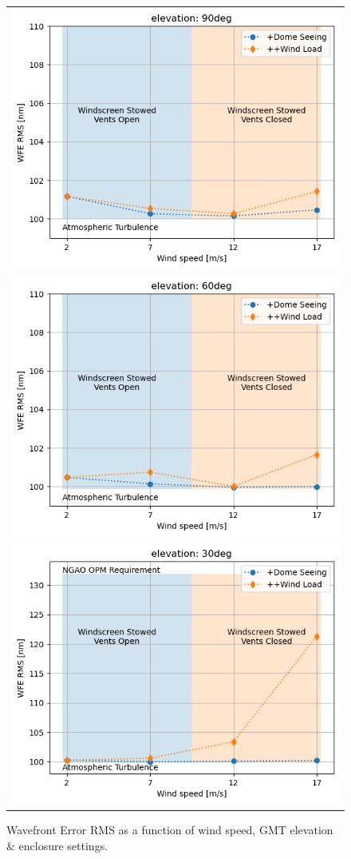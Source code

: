 \documentclass[]{AO4ELT}  %
\begin{document}
\begin{figure}
   \centering
   \begin{tabular}{c}
      \includegraphics[width=0.65\linewidth]{wfe-rms_el90.png} \\
      \includegraphics[width=0.65\linewidth]{wfe-rms_el60.png} \\
      \includegraphics[width=0.65\linewidth]{wfe-rms_el30.png}
   \end{tabular}
   \caption{Wavefront Error RMS as a function of wind speed, GMT elevation \& enclosure settings.}
   \label{fig:18}
\end{figure}
\end{document}
